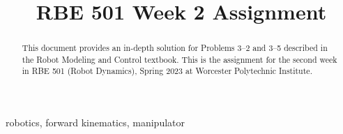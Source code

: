 \documentclass[conference]{IEEEtran}
\begin{document}
\title{RBE 501 Week 2 Assignment}

\author{
}

\maketitle

\begin{abstract}
This document provides an in-depth solution for Problems 3--2 and 3--5 described 
in the Robot Modeling and Control textbook.
This is the assignment for the second week in RBE 501 (Robot Dynamics),
Spring 2023 at Worcester Polytechnic Institute.
\end{abstract}

\begin{IEEEkeywords}
robotics, forward kinematics, manipulator
\end{IEEEkeywords}
\end{document}
